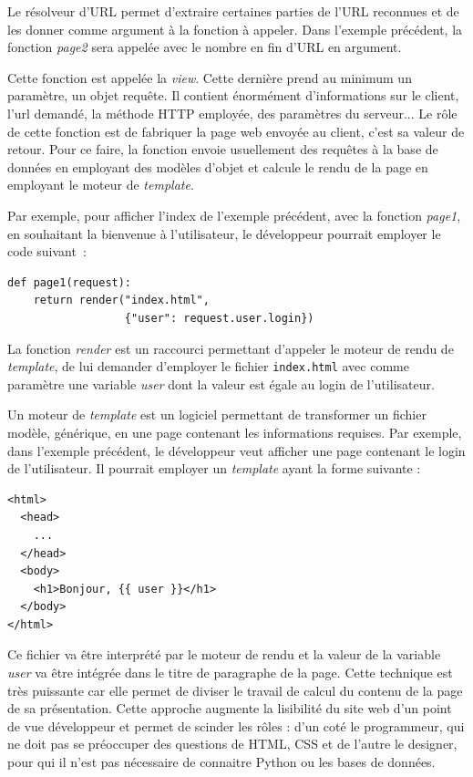 \documentclass[a4paper,12pt]{article}
\begin{document}
Le résolveur d'URL permet d'extraire certaines parties de l'URL reconnues et de les donner
comme argument à la fonction à appeler. Dans l'exemple précédent, la fonction \textit{page2}
sera appelée avec le nombre en fin d'URL en argument.

Cette fonction est appelée la \textit{view}. Cette dernière prend au minimum un paramètre,
un objet requête. Il contient énormément d'informations sur le client, l'url demandé,
la méthode HTTP employée, des paramètres du serveur... Le rôle de cette fonction
est de fabriquer la page web envoyée au client, c'est sa valeur de retour. Pour ce faire,
la fonction envoie usuellement des requêtes à la base de données en employant des modèles
d'objet et calcule le rendu de la page en employant le moteur de \textit{template}.

Par exemple, pour afficher l'index de l'exemple précédent, avec la fonction \textit{page1},
en souhaitant la bienvenue à l'utilisateur, le développeur pourrait employer le code
suivant~:

\begin{verbatim}
def page1(request):
    return render("index.html",
                  {"user": request.user.login})
\end{verbatim}

La fonction \textit{render} est un raccourci permettant d'appeler le moteur
de rendu de \textit{template}, de lui demander d'employer le fichier \texttt{index.html}
avec comme paramètre une variable \textit{user} dont la valeur est égale
au login de l'utilisateur.

Un moteur de \textit{template} est un logiciel permettant de transformer un fichier
modèle, générique, en une page contenant les informations requises. Par exemple,
dans l'exemple précédent, le développeur veut afficher une page contenant le
login de l'utilisateur. Il pourrait employer un \textit{template} ayant
la forme suivante : 

\begin{verbatim}
<html>
  <head>
    ...
  </head>
  <body>
    <h1>Bonjour, {{ user }}</h1>
  </body>
</html>
\end{verbatim}

Ce fichier va être interprété par le moteur de rendu et la valeur de la variable
\textit{user} va être intégrée dans le titre de paragraphe de la page. Cette
technique est très puissante car elle permet de diviser le travail de calcul
du contenu de la page de sa présentation. Cette approche augmente la lisibilité
du site web d'un point de vue développeur et permet de scinder les rôles : d'un
coté le programmeur, qui ne doit pas se préoccuper des questions
de HTML, CSS et de l'autre le designer, pour qui il n'est pas nécessaire de connaitre Python ou les bases de données.
\end{document}
